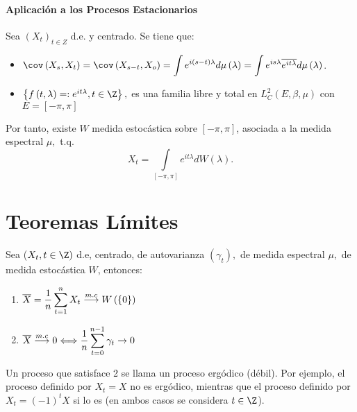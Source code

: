 \paragraph{Aplicaci\'{o}n a los Procesos Estacionarios}
Sea ${(X_{t})}_{t\in Z}$ d.e. y centrado. Se tiene que:

\begin{itemize}
\item $\displaystyle\cov\left( {X_{s} ,X_{t} } \right)=\cov\left( {X_{s-t} ,X_{o} } \right)=\int {e^{i\left( {s-t} \right)\lambda }d\mu \left( \lambda \right)=\int {e^{is\lambda }\overline {e^{it\lambda }} d\mu \left( \lambda \right)} } $. 
\item $\left\{ f\left(t,\lambda \right)=:e^{it\lambda }, t\in \Z \right\} ,$ es una familia libre y total en $L_{C}^{2} \left( {E,\beta ,\mu } \right)$ con $E=\left[ {-\pi ,\pi } \right]$
\end{itemize}

Por tanto, existe $W$ medida estoc\'{a}stica sobre $\left[ {-\pi ,\pi } \right]$, asociada a la medida espectral $\mu ,$ t.q.
\[
X_{t} =\int\limits_{\left[ {-\pi ,\pi } \right]} {e^{it\lambda }} dW\left( 
\lambda \right).
\]

\section{Teoremas L\'{i}mites}
\label{subsec:mylabel4}

\begin{teorema}
Sea ($X_{t} ,t\in \Z)$ d.e, centrado, de autovarianza $\left( {\gamma_{t} } \right),$ de medida espectral $\mu ,$ de medida estoc\'{a}stica $W$, 
entonces: 
\begin{enumerate}
 \item $\displaystyle\overline{X}=\frac{1}{n}\sum_{t=1}^n X_{t} \buildrel 
{m.c} \over \longrightarrow W\left( \left\{ 0 \right\} \right)$ 
\item $\displaystyle\overline X \buildrel {m.c} \over \longrightarrow 
0\Longleftrightarrow \frac{1}{n}\sum_{t=0}^{n-1} {\gamma_{t} } \to 
0$
\end{enumerate}

\end{teorema}

Un proceso que satisface 2 se llama un proceso erg\'{o}dico (d\'{e}bil). Por ejemplo, el proceso definido por $X_{t} =X$ no 
es erg\'{o}dico, mientras que el proceso definido por $X_{t} =\left( {-1} \right)^{t}X$ si lo es (en ambos casos se considera $t\in \Z$).

